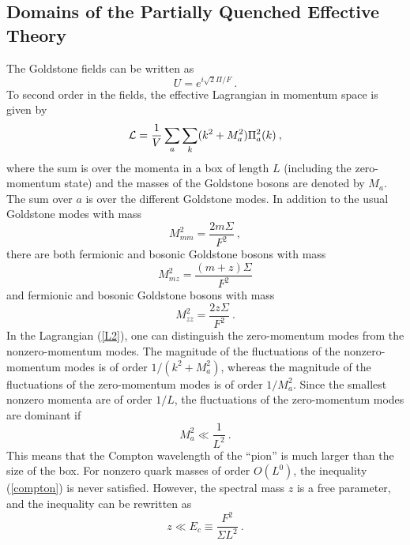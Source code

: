 \subsection{Domains of the Partially Quenched Effective Theory}
\label{sec:domains}

The Goldstone fields can be written as
\begin{equation}
  \label{Ufields}
  U = e^{i\sqrt 2\Pi/F}\:.
\end{equation}
To second order in the fields, the effective Lagrangian in momentum
space is given by
\begin{equation}
  {\cal L} = \frac 1V \sum_a\sum_k  (k^2 + M_a^2) \Pi_a^2(k)\:,
  \label{L2}
\end{equation}
where the sum is over the momenta in a box of length $L$ (including
the zero-momentum state) and the masses of the Goldstone bosons are
denoted by $M_a$. The sum over $a$ is over the different Goldstone
modes.  In addition to the usual Goldstone modes with mass
\begin{equation}
  \label{Gmass1}
  M_{mm}^2 = \frac{2m\Sigma}{F^2}\:,
\end{equation}
there are both fermionic and bosonic Goldstone bosons with mass
\begin{equation}
  M_{mz}^2 = \frac{(m+z)\Sigma}{F^2}
\end{equation}
and fermionic and bosonic Goldstone bosons with mass
\begin{equation}
  \label{Gmass3}
  M_{zz}^2 = \frac{2z\Sigma}{F^2}\:.
\end{equation}
In the Lagrangian (\ref{L2}), one can
distinguish the zero-momentum modes from the nonzero-momentum modes.
The magnitude of the fluctuations of the nonzero-momentum modes is of
order $1/(k^2+M^2_a)$, whereas the magnitude of the fluctuations of
the zero-momentum modes is of order $1/M_a^2$. Since the smallest
nonzero momenta are of order $1/L$, the fluctuations of the
zero-momentum modes are dominant if 
\begin{equation}
  \label{compton}
  M_a^2 \ll \frac 1{L^2}\:.
\end{equation}
This means that the Compton wavelength of the ``pion'' is much larger
than the size of the box.  For nonzero quark masses of order $O(L^0)$,
the inequality (\ref{compton}) is never satisfied. However, the
spectral mass $z$ is a free parameter, and the inequality can be
rewritten as \cite{Verb96,Trento}
\begin{equation}
  z \ll E_c\equiv\frac {F^2}{\Sigma L^2}\:.
  \label{spectralrange}
\end{equation}
